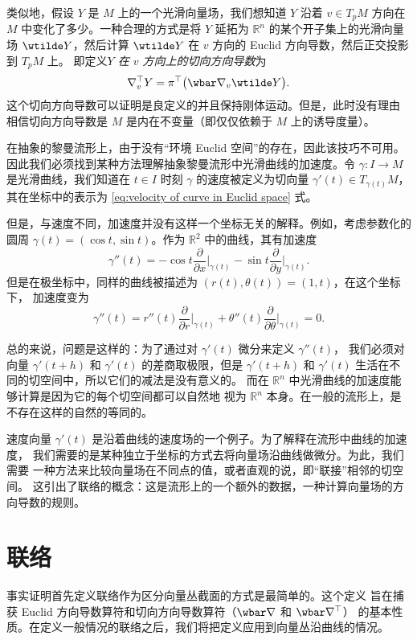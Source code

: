 \documentclass[fontset=none]{Notes}
\begin{document}
类似地，假设 $Y$ 是 $M$ 上的一个光滑向量场，我们想知道 $Y$ 沿着 
$v\in T_pM$ 方向在 $M$ 中变化了多少。一种合理的方式是将 $Y$ 延拓为
$\mathbb{R}^n$ 的某个开子集上的光滑向量场 $\wtilde Y$，然后计算
$\wtilde Y$ 在 $v$ 方向的 Euclid 方向导数，然后正交投影到 $T_pM$ 上。
即定义\emph{$Y$ 在 $v$ 方向上的切向方向导数}为
\begin{equation}
  \nabla_v^\top Y=\pi^\top\bigl(\wbar\nabla_v\wtilde Y\bigr).
\end{equation}
这个切向方向导数可以证明是良定义的并且保持刚体运动。但是，此时没有理由
相信切向方向导数是 $M$ 是内在不变量（即仅仅依赖于 $M$ 上的诱导度量）。

在抽象的黎曼流形上，由于没有“环境 Euclid 空间”的存在，因此该技巧不可用。
因此我们必须找到某种方法理解抽象黎曼流形中光滑曲线的加速度。令 $\gamma:I\to M$
是光滑曲线，我们知道在 $t\in I$ 时刻 $\gamma$ 的速度被定义为切向量
$\gamma'(t)\in T_{\gamma(t)}M$，其在坐标中的表示为 \eqref{eq:velocity of curve in Euclid space} 式。

但是，与速度不同，加速度并没有这样一个坐标无关的解释。例如，考虑参数化的圆周
$\gamma(t)=(\cos t,\sin t)$。作为 $\mathbb{R}^2$ 中的曲线，其有加速度
\[
  \gamma''(t)=-\cos t\frac{\partial}{\partial x}\bigg|_{\gamma(t)}
  -\sin t   \frac{\partial}{\partial y}\bigg|_{\gamma(t)}.
\]
但是在极坐标中，同样的曲线被描述为 $(r(t),\theta(t))= (1,t)$，在这个坐标下，
加速度变为
\[
  \gamma''(t)=r''(t)\frac{\partial}{\partial r}\bigg|_{\gamma(t)}   
  +\theta''(t)\frac{\partial}{\partial \theta}\bigg|_{\gamma(t)}=0.
\]

总的来说，问题是这样的：为了通过对 $\gamma'(t)$ 微分来定义 $\gamma''(t)$，
我们必须对向量 $\gamma'(t+h)$ 和 $\gamma'(t)$ 的差商取极限，但是
$\gamma'(t+h)$ 和 $\gamma'(t)$ 生活在不同的切空间中，所以它们的减法是没有意义的。
而在 $\mathbb{R}^n$ 中光滑曲线的加速度能够计算是因为它的每个切空间都可以自然地
视为 $\mathbb{R}^n$ 本身。在一般的流形上，是不存在这样的自然的等同的。

速度向量 $\gamma'(t)$ 是沿着曲线的速度场的一个例子。为了解释在流形中曲线的加速度，
我们需要的是某种独立于坐标的方式去将向量场沿曲线做微分。为此，我们需要
一种方法来比较向量场在不同点的值，或者直观的说，即“联接”相邻的切空间。
这引出了联络的概念：这是流形上的一个额外的数据，一种计算向量场的方向导数的规则。

\section{联络}

事实证明首先定义联络作为区分向量丛截面的方式是最简单的。这个定义
旨在捕获 Euclid 方向导数算符和切向方向导数算符（$\wbar\nabla$ 和 $\wbar\nabla^\top$）
的基本性质。在定义一般情况的联络之后，我们将把定义应用到向量丛沿曲线的情况。
\end{document}
